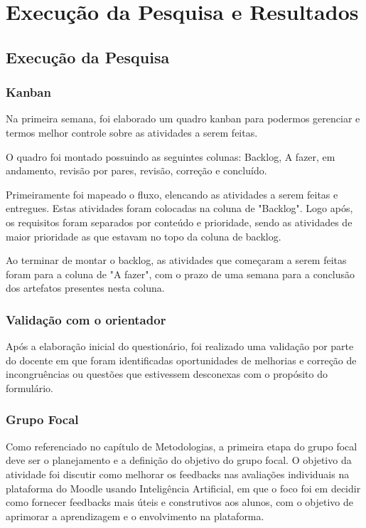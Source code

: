\chapter{Execução da Pesquisa e Resultados}

\section{Execução da Pesquisa}

\subsection{Kanban}

Na primeira semana, foi elaborado um quadro kanban para podermos gerenciar e termos melhor controle sobre as atividades a serem feitas.

O quadro foi montado possuindo as seguintes colunas: Backlog, A fazer, em andamento, revisão por pares, revisão, correção e concluído.

Primeiramente foi mapeado o fluxo, elencando as atividades a serem feitas e entregues. Estas atividades foram colocadas na coluna de "Backlog". Logo após, os requisitos foram separados por conteúdo e prioridade, sendo as atividades de maior prioridade as que estavam no topo da coluna de backlog.

Ao terminar de montar o backlog, as atividades que começaram a serem feitas foram para a coluna de "A fazer", com o prazo de uma semana para a conclusão dos artefatos presentes nesta coluna.

\subsection{Validação com o orientador}

Após a elaboração inicial do questionário, foi realizado uma validação por parte do docente em que foram identificadas oportunidades de melhorias e correção de incongruências ou questões que estivessem desconexas com o propósito do formulário.

\subsection{Grupo Focal}

Como referenciado no capítulo de Metodologias, a primeira etapa do grupo focal deve ser o planejamento e a definição do objetivo do grupo focal. O objetivo da atividade foi discutir como melhorar os feedbacks nas avaliações individuais na plataforma do Moodle usando Inteligência Artificial, em que o foco foi em decidir como fornecer feedbacks mais úteis e construtivos aos alunos, com o objetivo de aprimorar a aprendizagem e o envolvimento na plataforma.


